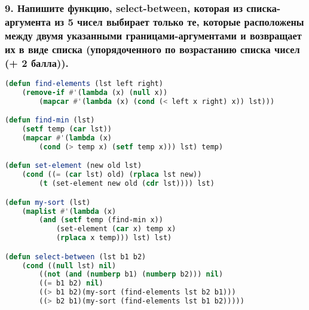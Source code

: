 \subsubsection*{9. Напишите функцию, select-between, которая из списка-аргумента из 5 чисел выбирает	только те, которые расположены между двумя указанными границами-аргументами и	возвращает их в виде списка (упорядоченного по возрастанию списка чисел (+ 2 балла)).}
\begin{lstlisting}[language=Lisp]
(defun find-elements (lst left right)
	(remove-if #'(lambda (x) (null x))
		(mapcar #'(lambda (x) (cond (< left x right) x)) lst)))

(defun find-min (lst)
	(setf temp (car lst))
	(mapcar #'(lambda (x)
		(cond (> temp x) (setf temp x))) lst) temp)

(defun set-element (new old lst)
	(cond ((= (car lst) old) (rplaca lst new))
		(t (set-element new old (cdr lst)))) lst)

(defun my-sort (lst)
	(maplist #'(lambda (x)
		(and (setf temp (find-min x))
			(set-element (car x) temp x)
			(rplaca x temp))) lst) lst)

(defun select-between (lst b1 b2)
	(cond ((null lst) nil)
		((not (and (numberp b1) (numberp b2))) nil)
		((= b1 b2) nil)
		((> b1 b2)(my-sort (find-elements lst b2 b1)))
		((> b2 b1)(my-sort (find-elements lst b1 b2)))))
\end{lstlisting}


